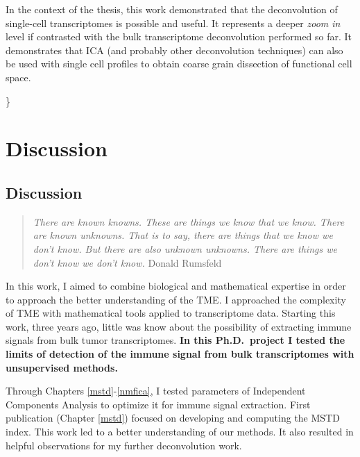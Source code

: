 \documentclass[12pt,]{book}
\theoremstyle{definition}
\theoremstyle{definition}
\theoremstyle{definition}
\theoremstyle{remark}
\begin{document}
In the context of the thesis, this work demonstrated that the
deconvolution of single-cell transcriptomes is possible and useful. It
represents a deeper \emph{zoom in} level if contrasted with the bulk
transcriptome deconvolution performed so far. It demonstrates that ICA
(and probably other deconvolution techniques) can also be used with
single cell profiles to obtain coarse grain dissection of functional
cell space.

\}

\hypertarget{part-discussion}{%
\part{Discussion}\label{part-discussion}}

\hypertarget{discussiongenerale}{%
\chapter{Discussion}\label{discussiongenerale}}

\begin{quote}
\emph{There are known knowns. These are things we know that we know.
There are known unknowns. That is to say, there are things that we know
we don't know. But there are also unknown unknowns. There are things we
don't know we don't know.} Donald Rumsfeld
\end{quote}

In this work, I aimed to combine biological and mathematical expertise
in order to approach the better understanding of the TME. I approached
the complexity of TME with mathematical tools applied to transcriptome
data. Starting this work, three years ago, little was know about the
possibility of extracting immune signals from bulk tumor transcriptomes.
\textbf{In this Ph.D.~project I tested the limits of detection of the
immune signal from bulk transcriptomes with unsupervised methods.}

Through Chapters \ref{mstd}-\ref{nmfica}, I tested parameters of
Independent Components Analysis to optimize it for immune signal
extraction. First publication (Chapter \ref{mstd}) focused on developing
and computing the MSTD index. This work led to a better understanding of
our methods. It also resulted in helpful observations for my further
deconvolution work.
\end{document}
